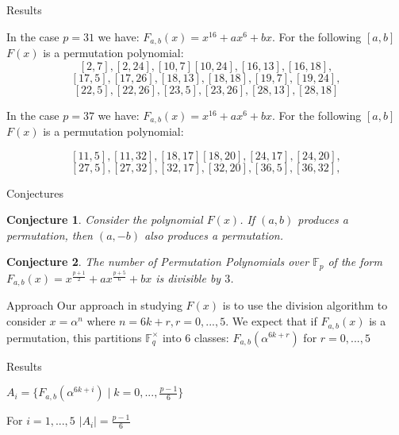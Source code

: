 \documentclass{beamer}
\newtheorem{conjecture}{Conjecture}
\begin{document}
\begin{frame}{Results}

In the case $p=31$ we have: $F_{a,b}(x)=x^{16} + ax^{6} + bx$. For the following $[a,b]$ $F(x)$ is a permutation polynomial:
$$[2, 7], [2, 24], [10, 7] [10, 24], [16,13], [16, 18],$$
$$[17, 5], [17, 26], [18, 13], [18, 18], [19, 7], [19, 24],$$
$$[22, 5], [22, 26], [23, 5], [23, 26], [28, 13], [28, 18]$$

In the case $p=37$ we have: $F_{a,b}(x)=x^{16} + ax^{6} + bx$. For the following $[a,b]$ $F(x)$ is a permutation polynomial:

$$[11, 5], [11, 32], [18, 17] [18, 20], [24,17], [24, 20],$$
$$[27, 5], [27, 32], [32, 17], [32, 20], [36, 5], [36, 32],$$


\end{frame}

\begin{frame}{Conjectures}

\begin{conjecture}
	Consider the polynomial $F(x)$. If $(a,b)$ produces a permutation, then $(a,-b)$ also produces a permutation.
\end{conjecture}

\begin{conjecture}
	The number of Permutation Polynomials over $\mathbb{F}_{p}$ of the form $F_{a,b}(x)=x^{\frac{p+1}{2}} + ax^{\frac{p+5}{6}} + bx$ is divisible by $3$.
\end{conjecture}

\end{frame}

\begin{frame}{Approach}
Our approach in studying $F(x)$ is to use the division algorithm to consider $x=\alpha^{n}$ where $n=6k+r, r=0,...,5$.
\linebreak
\linebreak
We expect that if $F_{a,b}(x)$ is a permutation, this partitions $\mathbb{F}_{q}^{\times}$ into 6 classes: $F_{a,b}(\alpha^{6k+r})$ for $r=0,...,5$
\end{frame}

\begin{frame}{Results}


  \begin{definition}
	$A_{i}=\lbrace F_{a,b}(\alpha^{6k+i}) \mid k=0,...,\frac{p-1}{6}\rbrace$
\end{definition}

\begin{lemma}
	For $i=1,...,5$ $\left\vert A_{i} \right\vert = \frac{p-1}{6}$
\end{lemma}

\end{frame}
\end{document}
